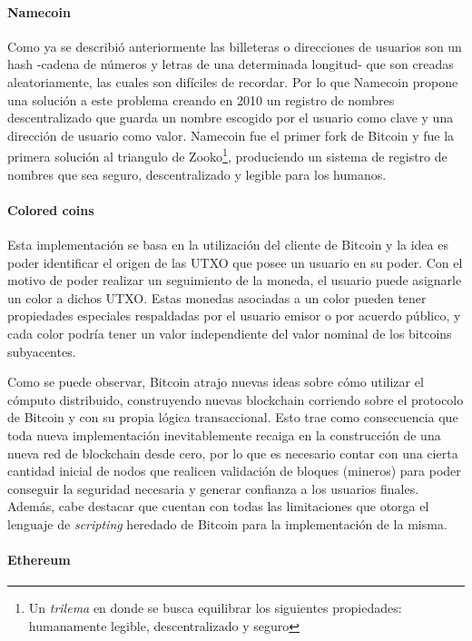 \paragraph{Namecoin}

Como ya se describió anteriormente las billeteras o direcciones de usuarios son un hash -cadena de números y letras de una determinada longitud- que son creadas aleatoriamente, las cuales son difíciles de recordar. Por lo que Namecoin propone una solución a este problema creando en 2010 un registro de nombres descentralizado que guarda un nombre escogido por el usuario como clave y una dirección de usuario como valor. Namecoin fue el primer fork de Bitcoin y fue la primera solución al triangulo de Zooko\footnote{Un \textit{trilema} en donde se busca equilibrar los siguientes propiedades: humanamente legible, descentralizado y seguro}, produciendo un sistema de registro de nombres que sea seguro, descentralizado y legible para los humanos.

\paragraph{Colored coins}

Esta implementación se basa en la utilización del cliente de Bitcoin y la idea es poder identificar el origen de las UTXO que posee un usuario en su poder. Con el motivo de poder realizar un seguimiento de la moneda, el usuario puede asignarle un color a dichos UTXO. Estas monedas asociadas a un color pueden tener propiedades especiales respaldadas por el usuario emisor o por acuerdo público, y cada color podría tener un valor independiente del valor nominal de los bitcoins subyacentes.

Como se puede observar, Bitcoin atrajo nuevas ideas sobre cómo utilizar el cómputo distribuido, construyendo nuevas blockchain corriendo sobre el protocolo de Bitcoin y con su propia lógica transaccional. Esto trae como consecuencia que toda nueva implementación inevitablemente recaiga en la construcción de una nueva red de blockchain desde cero, por lo que es necesario contar con una cierta cantidad inicial de nodos que realicen validación de bloques (mineros) para poder conseguir la seguridad necesaria y generar confianza a los usuarios finales. Además, cabe destacar que cuentan con todas las limitaciones que otorga el lenguaje de \textit{scripting} heredado de Bitcoin para la implementación de la misma.

\paragraph{Ethereum}

